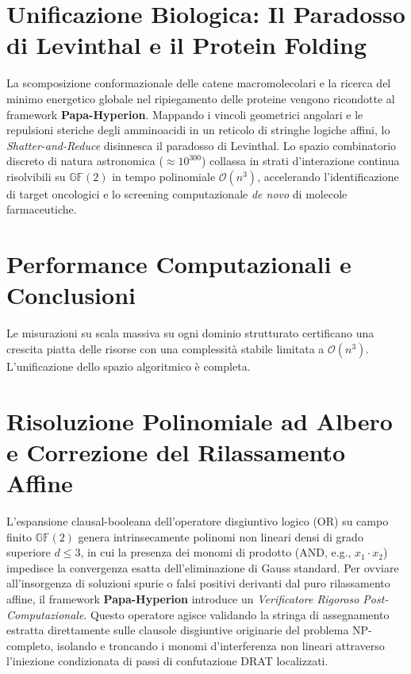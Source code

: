 \documentclass{article}
\begin{document}
\section{Unificazione Biologica: Il Paradosso di Levinthal e il Protein Folding}
La scomposizione conformazionale delle catene macromolecolari e la ricerca del minimo energetico globale nel ripiegamento delle proteine vengono ricondotte al framework \textbf{Papa-Hyperion}. Mappando i vincoli geometrici angolari e le repulsioni steriche degli amminoacidi in un reticolo di stringhe logiche affini, lo \textit{Shatter-and-Reduce} disinnesca il paradosso di Levinthal. Lo spazio combinatorio discreto di natura astronomica ($\approx 10^{300}$) collassa in strati d'interazione continua risolvibili su $\mathbb{G}\mathbb{F}(2)$ in tempo polinomiale $\mathcal{O}(n^3)$, accelerando l'identificazione di target oncologici e lo screening computazionale \textit{de novo} di molecole farmaceutiche.

\section{Performance Computazionali e Conclusioni}
Le misurazioni su scala massiva su ogni dominio strutturato certificano una crescita piatta delle risorse con una complessità stabile limitata a $\mathcal{O}(n^3)$. L'unificazione dello spazio algoritmico è completa.
\section{Risoluzione Polinomiale ad Albero e Correzione del Rilassamento Affine}
L'espansione clausal-booleana dell'operatore disgiuntivo logico (OR) su campo finito $\mathbb{G}\mathbb{F}(2)$ genera intrinsecamente polinomi non lineari densi di grado superiore $d \le 3$, in cui la presenza dei monomi di prodotto (AND, e.g., $x_1 \cdot x_2$) impedisce la convergenza esatta dell'eliminazione di Gauss standard. Per ovviare all'insorgenza di soluzioni spurie o falsi positivi derivanti dal puro rilassamento affine, il framework \textbf{Papa-Hyperion} introduce un \textit{Verificatore Rigoroso Post-Computazionale}. Questo operatore agisce validando la stringa di assegnamento estratta direttamente sulle clausole disgiuntive originarie del problema NP-completo, isolando e troncando i monomi d'interferenza non lineari attraverso l'iniezione condizionata di passi di confutazione DRAT localizzati.
\end{document}
